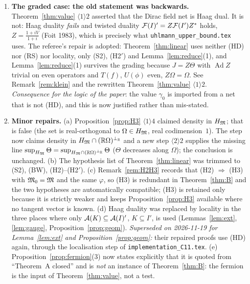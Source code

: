 \documentclass[11pt]{article}
\newcommand{\Om}{\Omega}
\newcommand{\HM}{H_{\cM}}
\newcommand{\Ad}{\operatorname{Ad}}
\begin{document}
\begin{enumerate}[leftmargin=1.8em]
\item[\textbf{R3}] \textbf{The graded case: the old statement was backwards.}  Theorem~\ref{thm:value}
 $\langle1\rangle2$ asserted that the Dirac field net is Haag dual.  It is not: Haag duality \emph{fails}
 and twisted duality $\mathcal F(I)'=Z\mathcal F(I')Z^*$ holds, $Z=\frac{1+iV}{1+i}$ (Foit 1983), which is precisely what
 \texttt{uhlmann\_upper\_bound.tex} uses.  The referee's repair is adopted: Theorem~\ref{thm:linear} uses
 neither (HD) nor (RS) nor locality, only (S2), (H2$'$) and Lemma~\ref{lem:reduce}(1), and
 Lemma~\ref{lem:reduce}(1) survives the grading because $J=Z\Theta$ with $\Ad Z$ trivial on even operators
 and $T(f)$, $U(\phi)$ even, $Z\Om=\Om$.  See Remark~\ref{rem:klein} and the rewritten
 Theorem~\ref{thm:value} $\langle1\rangle2$.  \emph{Consequence for the logic of the paper}: the value
 $\gamma_0$ is imported from a net that is not (HD), and this is now justified rather than mis-stated.
\item[\textbf{R4}] \textbf{Minor repairs.}
 (a) Proposition~\ref{prop:H3} $\langle1\rangle4$ claimed density in $\HM$; that is false (the set is
 real-orthogonal to $\Om\in\HM$, real codimension~$1$).  The step now claims density in
 $\HM\cap(\mathbb R\Om)^{\perp_{\mathbb R}}$ and a new step $\langle2\rangle2$ supplies the missing line
 $\sup_{\HM}\Theta=\sup_{\HM\cap(\mathbb R\Om)^{\perp_{\mathbb R}}}\Theta$ ($\Theta$ decreases along $\Om$);
 the conclusion is unchanged.
 (b) The hypothesis list of Theorem~\ref{thm:linear} was trimmed to (S2), (BW), (H2)--(H2$'$).
 (c) Remark~\ref{rem:H2H3} records that (H2) $\Rightarrow$ (H3) with $\mathfrak M_0=\mathfrak M$ and the same $\varphi$, so
 (H3) is redundant in Theorem~\ref{thm:B} and the two hypotheses are automatically compatible; (H3) is
 retained only because it is strictly weaker and keeps Proposition~\ref{prop:H3} available where no tangent
 vector is known.
 (d) Haag duality was replaced by locality in the three places where only
 $\mathcal A(K)\subseteq\mathcal A(I)'$, $K\subseteq I'$, is used (Lemmas~\ref{lem:ext}, \ref{lem:gauge},
 Proposition~\ref{prop:geom}).  \emph{Superseded on 2026-11-19 for Lemma~\ref{lem:ext} and Proposition~\ref{prop:geom}:} their repaired proofs use (HD) again, through the localisation step of \texttt{implementation\_C11.tex}.
 (e) Proposition~\ref{prop:fermion}(3) now states explicitly that it is quoted from
 ``Theorem~A closed'' and is \emph{not} an instance of Theorem~\ref{thm:B}: the fermion is the input of
 Theorem~\ref{thm:value}, not a test.
\end{enumerate}
\end{document}
